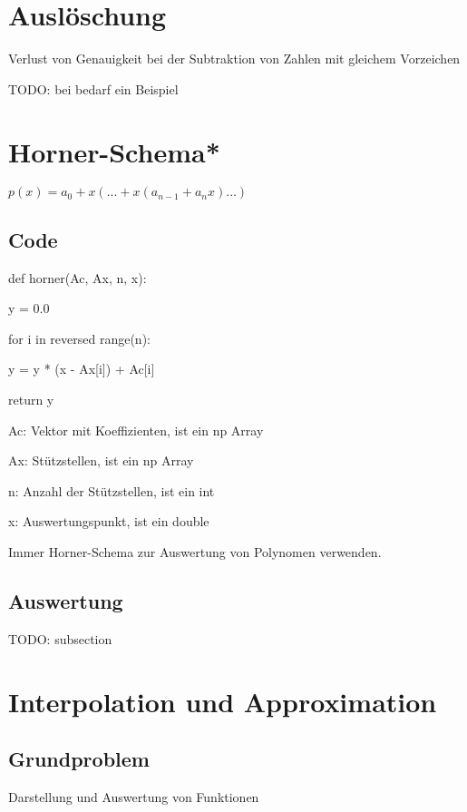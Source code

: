 \documentclass[12pt,a4paper]{article} %
\newcommand*\tab[1][1cm]{\hspace*{#1}}
\begin{document}
	\section{Auslöschung}
	
	Verlust von Genauigkeit bei der Subtraktion von Zahlen mit gleichem Vorzeichen
	
	TODO: bei bedarf ein Beispiel
	
	\newpage
	
	\section{Horner-Schema*}
	
	$p(x) = a_0 + x(... + x(a_{n-1} + a_nx)...)$
	
	\subsection{Code}
	
	def horner(Ac, Ax, n, x): 
	
	y = 0.0
	
	for i in reversed range(n):
	
	\tab y = y * (x - Ax[i]) + Ac[i]
 
	return y
	
	Ac: Vektor mit Koeffizienten, ist ein np Array
	
	Ax: Stützstellen, ist ein np Array
	
	n: Anzahl der Stützstellen, ist ein int
	
	x: Auswertungspunkt, ist ein double
	
	Immer Horner-Schema zur Auswertung von Polynomen verwenden.
	
	\subsection{Auswertung}
	TODO: subsection
	
	\newpage
	
	\section{Interpolation und Approximation}
	
	\subsection{Grundproblem}
	
	Darstellung und Auswertung von Funktionen
	
\end{document}
